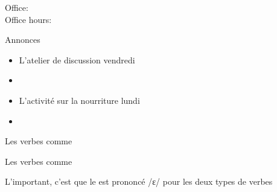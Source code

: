 \documentclass{beamer}
\subtitle[Verbes (\lexi{acheter} et \lexi{appeler})]{Les verbes comme \lexi{acheter} et \lexi{appeler}}
\begin{document}
  \begin{frame}
    \titlepage
    \tiny{Office: \\
          Office hours: }
  \end{frame}

  \begin{frame}{Annonces}
    \begin{itemize}
      \item L'atelier de discussion vendredi
      \item[] 
      \item L'activité sur la nourriture lundi
      \item[] 
    \end{itemize}
  \end{frame}

  \begin{frame}{Les verbes comme }
    \begin{center}
      
    \end{center}
  \end{frame}

  \begin{frame}{Les verbes comme }
    \begin{center}
      
    \end{center}
    L'important, c'est que le  est prononcé /ɛ/ pour les deux types de verbes\\
  \end{frame}
\end{document}
